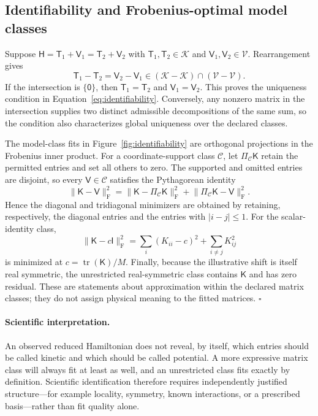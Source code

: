 \documentclass[11pt]{article}
\newcommand{\fro}{\mathrm{F}}
\newcommand{\mat}[1]{\mathsf{#1}}
\begin{document}
\subsection{Identifiability and Frobenius-optimal model classes}

Suppose
$\mat{H}=\mat{T}_1+\mat{V}_1=\mat{T}_2+\mat{V}_2$ with
$\mat{T}_1,\mat{T}_2\in\mathcal K$ and
$\mat{V}_1,\mat{V}_2\in\mathcal V$. Rearrangement gives
\begin{equation}
 \mat{T}_1-\mat{T}_2
 =\mat{V}_2-\mat{V}_1
 \in(\mathcal K-\mathcal K)\cap(\mathcal V-\mathcal V).
\end{equation}
If the intersection is $\{\mat{0}\}$, then
$\mat{T}_1=\mat{T}_2$ and $\mat{V}_1=\mat{V}_2$. This proves the uniqueness condition
in Equation~\eqref{eq:identifiability}. Conversely, any nonzero matrix in the
intersection supplies two distinct admissible decompositions of the same sum, so the
condition also characterizes global uniqueness over the declared classes.

The model-class fits in Figure~\ref{fig:identifiability} are orthogonal projections in
the Frobenius inner product. For a coordinate-support class $\mathcal C$, let
$\Pi_{\mathcal C}\mat{K}$ retain the permitted entries and set all others to zero.
The supported and omitted entries are disjoint, so every
$\mat{V}\in\mathcal C$ satisfies the Pythagorean identity
\begin{equation}
 \lVert\mat{K}-\mat{V}\rVert_{\fro}^2
 =\lVert\mat{K}-\Pi_{\mathcal C}\mat{K}\rVert_{\fro}^2
 +\lVert\Pi_{\mathcal C}\mat{K}-\mat{V}\rVert_{\fro}^2.
 \label{eq:appendix-model-fit-pythagorean}
\end{equation}
Hence the diagonal and tridiagonal minimizers are obtained by retaining, respectively,
the diagonal entries and the entries with $|i-j|\leq1$. For the scalar-identity class,
\begin{equation}
 \lVert\mat{K}-c\mat{I}\rVert_{\fro}^2
 =\sum_i(K_{ii}-c)^2+\sum_{i\neq j}K_{ij}^2
\end{equation}
is minimized at $c=\operatorname{tr}(\mat{K})/M$. Finally, because the illustrative
shift is itself real symmetric, the unrestricted real-symmetric class contains
$\mat{K}$ and has zero residual. These are statements about approximation within the
declared matrix classes; they do not assign physical meaning to the fitted matrices.
\hfill$\square$

\paragraph{Scientific interpretation.}
An observed reduced Hamiltonian does not reveal, by itself, which entries should be
called kinetic and which should be called potential. A more expressive matrix class
will always fit at least as well, and an unrestricted class fits exactly by definition.
Scientific identification therefore requires independently justified structure---for
example locality, symmetry, known interactions, or a prescribed basis---rather than
fit quality alone.
\end{document}
